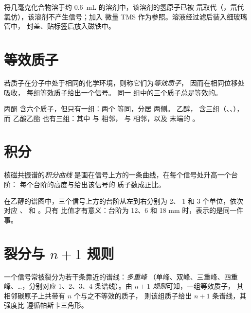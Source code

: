 \begin{inthelab}[制备核磁管]
将几毫克化合物溶于约
\qty{0.6}{mL} 的溶剂中，该溶剂的氢原子已被
氘取代（，氘代氯仿），该溶剂不产生信号；加入
微量 TMS 作为参照。溶液经过滤后装入细玻璃管中，
封盖、贴标签后放入磁铁中。
\end{inthelab}

\section{等效质子}

\begin{definition}[等效质子]\label{def:g12:proton-nmr:equivalent}
若质子在分子中处于相同的化学环境，则称它们为\emph{等效质子}，
因而在相同位移处吸收，
每组等效质子给出一个信号。
同一  组中的三个质子总是等效的。
\end{definition}

\begin{example}[计数基团]\label{ex:g12:proton-nmr:groups}
丙酮  含六个质子，但只有一组：两个
 等同，分居  两侧。
乙醇， 含三组（、、），而
乙酸乙酯  也有三组：其中 
与  相邻， 与  相邻，以及
末端的 。
\end{example}

\section{积分}

\begin{definition}[积分曲线]\label{def:g12:proton-nmr:integration}
核磁共振谱的\emph{积分曲线}
是画在信号上方的一条曲线，在每个信号处升高一个台阶：
每个台阶的高度与给出该信号的
质子数成正比。
\end{definition}

\begin{example}[读取台阶]\label{ex:g12:proton-nmr:steps}
在乙醇的谱图中，三个信号上方的台阶从左到右分别为 2、
1 和 3 个单位，依次对应 、 和 。只有
比值才有意义：台阶为 12、6 和 18 mm 时，表示的是同一件事。
\end{example}

\section{裂分与 \texorpdfstring{$n+1$}{n+1} 规则}


\begin{definition}[多重峰、$n+1$ 规则]\label{def:g12:proton-nmr:multiplet}
一个信号常被裂分为若干条靠近的谱线：\emph{多重峰}
（单峰、双峰、三重峰、四重峰、\dots{}，分别对应 1、2、3、4 条谱线）。由
\emph{$n+1$ 规则}可知，一组等效质子，
其相邻碳原子上共带有 $n$ 个与之不等效的质子，
则该组质子给出 $n+1$ 条谱线，其强度比
遵循帕斯卡三角形。
\end{definition}

